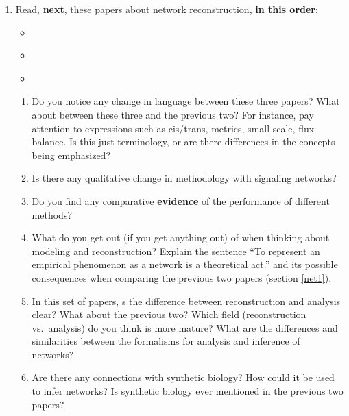 \begin{enumerate}
\begin{enumerate}
  \end{enumerate}

\item Read, \textbf{next}, these papers about network reconstruction,
  \textbf{in this order}:
  \begin{itemize}
  \item \cite{Hyduke2010}
  \item \cite{Kim-Transcriptional-2009}
  \item \cite{Butts-networks-2009}
  \end{itemize}

  \begin{enumerate}
  \item Do you notice any change in language between these three papers?
    What about between these three and the previous two? For
    instance, pay attention to expressions such as cis/trans, metrics,
    small-scale, flux-balance. Is this just terminology, or are there
    differences in the concepts being emphasized?
  \item Is there any qualitative change in methodology with signaling networks?
  \item Do you find any comparative \textbf{evidence} of the performance
    of different methods?
  \item What do you get out (if you get anything out) of
    \cite{Butts-networks-2009} when thinking about modeling and
    reconstruction? Explain the sentence ``To represent an empirical
    phenomenon as a network is a theoretical act.'' and its possible
    consequences when comparing the previous two papers (section
    \ref{net1}).
  \item In this set of papers, s the difference between reconstruction and
    analysis clear? What about the previous two? Which field
    (reconstruction vs.\ analysis) do you think is more mature? What are
    the differences and similarities between the formalisms for analysis
    and inference of networks?
  \item Are there any connections with synthetic biology? How could it be
    used to infer networks? Is synthetic biology ever mentioned in the
    previous two papers?
  \end{enumerate}





\end{enumerate}
